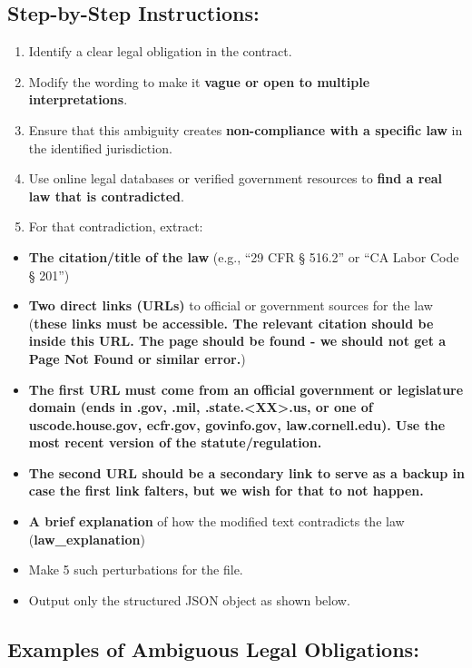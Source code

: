 \documentclass[11pt]{article}
\begin{document}
\begin{tcolorbox}[breakable,colback=lightestgray,colframe=black,title=\textbf{Ambiguity Legal Data Generation Prompt}]
\subsection*{\textbf{Step-by-Step Instructions:}}
\begin{enumerate}
    \item Identify a clear legal obligation in the contract.
    \item Modify the wording to make it \textbf{vague or open to multiple interpretations}.
    \item Ensure that this ambiguity creates \textbf{non-compliance with a specific law} in the identified jurisdiction.
    \item Use online legal databases or verified government resources to \textbf{find a real law that is contradicted}.
    \item For that contradiction, extract:
\end{enumerate}
\begin{itemize}
    \item \textbf{The citation/title of the law} (e.g., ``29 CFR § 516.2'' or ``CA Labor Code § 201'')
    \item \textbf{Two direct links (URLs)} to official or government sources for the law (\textbf{these links must be accessible. The relevant citation should be inside this URL. The page should be found - we should not get a Page Not Found or similar error.})
    \item \textbf{The first URL must come from an official government or legislature domain (ends in .gov, .mil, .state.<XX>.us, or one of uscode.house.gov, ecfr.gov, govinfo.gov, law.cornell.edu). Use the most recent version of the statute/regulation.}
    \item \textbf{The second URL should be a secondary link to serve as a backup in case the first link falters, but we wish for that to not happen.}
    \item \textbf{A brief explanation} of how the modified text contradicts the law (\textbf{law\_explanation})
    \item Make 5 such perturbations for the file.
    \item Output only the structured JSON object as shown below.
\end{itemize}

\subsection*{\textbf{Examples of Ambiguous Legal Obligations:}}


\end{tcolorbox}
\end{document}
